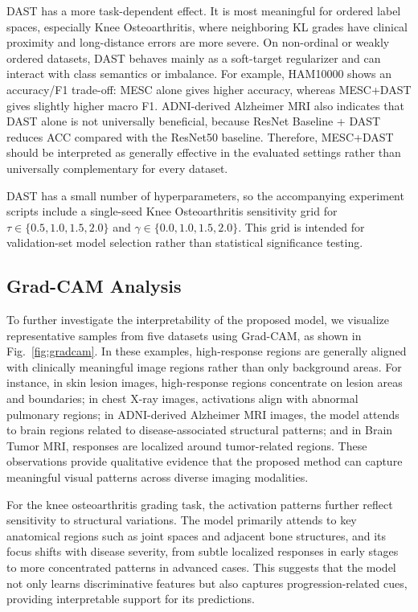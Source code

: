 \documentclass[runningheads]{llncs}
\begin{document}
DAST has a more task-dependent effect. It is most meaningful for ordered label spaces, especially Knee Osteoarthritis, where neighboring KL grades have clinical proximity and long-distance errors are more severe. On non-ordinal or weakly ordered datasets, DAST behaves mainly as a soft-target regularizer and can interact with class semantics or imbalance. For example, HAM10000 shows an accuracy/F1 trade-off: MESC alone gives higher accuracy, whereas MESC+DAST gives slightly higher macro F1. ADNI-derived Alzheimer MRI also indicates that DAST alone is not universally beneficial, because ResNet Baseline + DAST reduces ACC compared with the ResNet50 baseline. Therefore, MESC+DAST should be interpreted as generally effective in the evaluated settings rather than universally complementary for every dataset.

DAST has a small number of hyperparameters, so the accompanying experiment scripts include a single-seed Knee Osteoarthritis sensitivity grid for \(\tau \in \{0.5,1.0,1.5,2.0\}\) and \(\gamma \in \{0.0,1.0,1.5,2.0\}\). This grid is intended for validation-set model selection rather than statistical significance testing.

\subsection{Grad-CAM Analysis}

To further investigate the interpretability of the proposed model, we visualize representative samples from five datasets using Grad-CAM, as shown in Fig.~\ref{fig:gradcam}. In these examples, high-response regions are generally aligned with clinically meaningful image regions rather than only background areas. For instance, in skin lesion images, high-response regions concentrate on lesion areas and boundaries; in chest X-ray images, activations align with abnormal pulmonary regions; in ADNI-derived Alzheimer MRI images, the model attends to brain regions related to disease-associated structural patterns; and in Brain Tumor MRI, responses are localized around tumor-related regions. These observations provide qualitative evidence that the proposed method can capture meaningful visual patterns across diverse imaging modalities.

For the knee osteoarthritis grading task, the activation patterns further reflect sensitivity to structural variations. The model primarily attends to key anatomical regions such as joint spaces and adjacent bone structures, and its focus shifts with disease severity, from subtle localized responses in early stages to more concentrated patterns in advanced cases. This suggests that the model not only learns discriminative features but also captures progression-related cues, providing interpretable support for its predictions.
\end{document}
